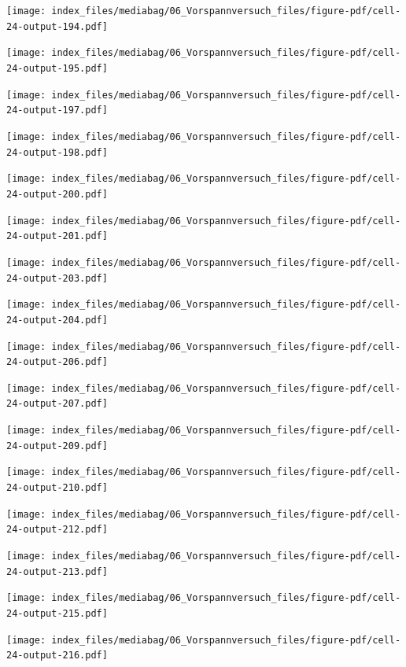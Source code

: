 \documentclass[
  11pt,
  letterpaper,
]{scrreprt}
\begin{document}
\newpage{}

\texttt{[image: index\_files/mediabag/06\_Vorspannversuch\_files/figure-pdf/cell-24-output-194.pdf]}

\texttt{[image: index\_files/mediabag/06\_Vorspannversuch\_files/figure-pdf/cell-24-output-195.pdf]}

\newpage{}

\texttt{[image: index\_files/mediabag/06\_Vorspannversuch\_files/figure-pdf/cell-24-output-197.pdf]}

\texttt{[image: index\_files/mediabag/06\_Vorspannversuch\_files/figure-pdf/cell-24-output-198.pdf]}

\newpage{}

\texttt{[image: index\_files/mediabag/06\_Vorspannversuch\_files/figure-pdf/cell-24-output-200.pdf]}

\texttt{[image: index\_files/mediabag/06\_Vorspannversuch\_files/figure-pdf/cell-24-output-201.pdf]}

\newpage{}

\texttt{[image: index\_files/mediabag/06\_Vorspannversuch\_files/figure-pdf/cell-24-output-203.pdf]}

\texttt{[image: index\_files/mediabag/06\_Vorspannversuch\_files/figure-pdf/cell-24-output-204.pdf]}

\newpage{}

\texttt{[image: index\_files/mediabag/06\_Vorspannversuch\_files/figure-pdf/cell-24-output-206.pdf]}

\texttt{[image: index\_files/mediabag/06\_Vorspannversuch\_files/figure-pdf/cell-24-output-207.pdf]}

\newpage{}

\texttt{[image: index\_files/mediabag/06\_Vorspannversuch\_files/figure-pdf/cell-24-output-209.pdf]}

\texttt{[image: index\_files/mediabag/06\_Vorspannversuch\_files/figure-pdf/cell-24-output-210.pdf]}

\newpage{}

\texttt{[image: index\_files/mediabag/06\_Vorspannversuch\_files/figure-pdf/cell-24-output-212.pdf]}

\texttt{[image: index\_files/mediabag/06\_Vorspannversuch\_files/figure-pdf/cell-24-output-213.pdf]}

\newpage{}

\texttt{[image: index\_files/mediabag/06\_Vorspannversuch\_files/figure-pdf/cell-24-output-215.pdf]}

\texttt{[image: index\_files/mediabag/06\_Vorspannversuch\_files/figure-pdf/cell-24-output-216.pdf]}
\end{document}
